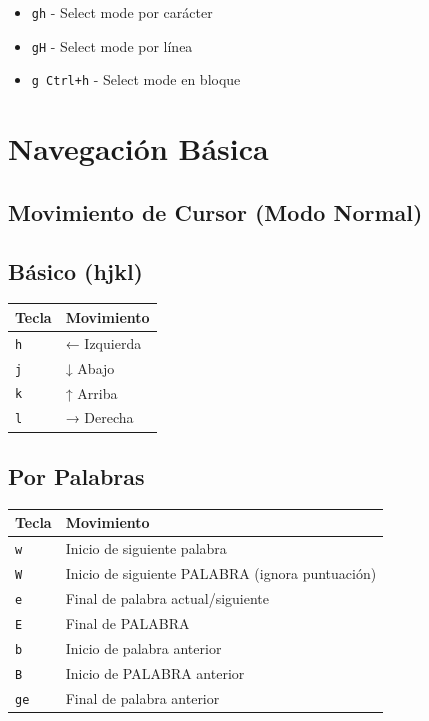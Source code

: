 \documentclass[
  doc,
  floatsintext,
  longtable,
  a4paper,
  nolmodern,
  notxfonts,
  notimes,
  12pt,
  colorlinks=true,linkcolor=blue,citecolor=blue,urlcolor=blue]{apa7}
\providecommand{\tightlist}{%
  \setlength{\itemsep}{0pt}\setlength{\parskip}{0pt}}
\newcounter{none} %
\begin{document}
\begin{itemize}
\tightlist
\item
  \texttt{gh} - Select mode por carácter
\item
  \texttt{gH} - Select mode por línea
\item
  \texttt{g\ Ctrl+h} - Select mode en bloque
\end{itemize}

\section{Navegación Básica}\label{navegaciuxf3n-buxe1sica}

\subsection{Movimiento de Cursor (Modo
Normal)}\label{movimiento-de-cursor-modo-normal}

\subsection{Básico (hjkl)}\label{buxe1sico-hjkl}

{\def\LTcaptype{none} %
\begin{longtable}[]{@{}ll@{}}
\toprule\noalign{}
Tecla & Movimiento \\
\midrule\noalign{}
\endhead
\bottomrule\noalign{}
\endlastfoot
\texttt{h} & ← Izquierda \\
\texttt{j} & ↓ Abajo \\
\texttt{k} & ↑ Arriba \\
\texttt{l} & → Derecha \\
\end{longtable}
}

\subsection{Por Palabras}\label{por-palabras}

{\def\LTcaptype{none} %
\begin{longtable}[]{@{}ll@{}}
\toprule\noalign{}
Tecla & Movimiento \\
\midrule\noalign{}
\endhead
\bottomrule\noalign{}
\endlastfoot
\texttt{w} & Inicio de siguiente palabra \\
\texttt{W} & Inicio de siguiente PALABRA (ignora puntuación) \\
\texttt{e} & Final de palabra actual/siguiente \\
\texttt{E} & Final de PALABRA \\
\texttt{b} & Inicio de palabra anterior \\
\texttt{B} & Inicio de PALABRA anterior \\
\texttt{ge} & Final de palabra anterior \\
\end{longtable}
}
\end{document}

